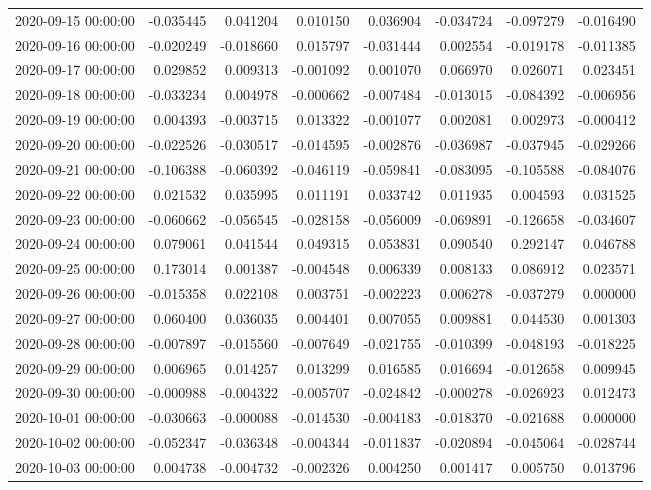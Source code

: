 \begin{tabular}{lrrrrrrr}
2020-09-15 00:00:00 & -0.035445 & 0.041204 & 0.010150 & 0.036904 & -0.034724 & -0.097279 & -0.016490 \\
2020-09-16 00:00:00 & -0.020249 & -0.018660 & 0.015797 & -0.031444 & 0.002554 & -0.019178 & -0.011385 \\
2020-09-17 00:00:00 & 0.029852 & 0.009313 & -0.001092 & 0.001070 & 0.066970 & 0.026071 & 0.023451 \\
2020-09-18 00:00:00 & -0.033234 & 0.004978 & -0.000662 & -0.007484 & -0.013015 & -0.084392 & -0.006956 \\
2020-09-19 00:00:00 & 0.004393 & -0.003715 & 0.013322 & -0.001077 & 0.002081 & 0.002973 & -0.000412 \\
2020-09-20 00:00:00 & -0.022526 & -0.030517 & -0.014595 & -0.002876 & -0.036987 & -0.037945 & -0.029266 \\
2020-09-21 00:00:00 & -0.106388 & -0.060392 & -0.046119 & -0.059841 & -0.083095 & -0.105588 & -0.084076 \\
2020-09-22 00:00:00 & 0.021532 & 0.035995 & 0.011191 & 0.033742 & 0.011935 & 0.004593 & 0.031525 \\
2020-09-23 00:00:00 & -0.060662 & -0.056545 & -0.028158 & -0.056009 & -0.069891 & -0.126658 & -0.034607 \\
2020-09-24 00:00:00 & 0.079061 & 0.041544 & 0.049315 & 0.053831 & 0.090540 & 0.292147 & 0.046788 \\
2020-09-25 00:00:00 & 0.173014 & 0.001387 & -0.004548 & 0.006339 & 0.008133 & 0.086912 & 0.023571 \\
2020-09-26 00:00:00 & -0.015358 & 0.022108 & 0.003751 & -0.002223 & 0.006278 & -0.037279 & 0.000000 \\
2020-09-27 00:00:00 & 0.060400 & 0.036035 & 0.004401 & 0.007055 & 0.009881 & 0.044530 & 0.001303 \\
2020-09-28 00:00:00 & -0.007897 & -0.015560 & -0.007649 & -0.021755 & -0.010399 & -0.048193 & -0.018225 \\
2020-09-29 00:00:00 & 0.006965 & 0.014257 & 0.013299 & 0.016585 & 0.016694 & -0.012658 & 0.009945 \\
2020-09-30 00:00:00 & -0.000988 & -0.004322 & -0.005707 & -0.024842 & -0.000278 & -0.026923 & 0.012473 \\
2020-10-01 00:00:00 & -0.030663 & -0.000088 & -0.014530 & -0.004183 & -0.018370 & -0.021688 & 0.000000 \\
2020-10-02 00:00:00 & -0.052347 & -0.036348 & -0.004344 & -0.011837 & -0.020894 & -0.045064 & -0.028744 \\
2020-10-03 00:00:00 & 0.004738 & -0.004732 & -0.002326 & 0.004250 & 0.001417 & 0.005750 & 0.013796 \\

\end{tabular}
